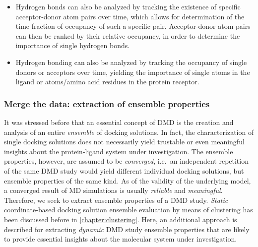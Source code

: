 \begin{itemize}
\begin{itemize}
\item Hydrogen bonds can also be analyzed by tracking the existence of specific
acceptor-donor atom pairs over time, which allows for determination of the time
fraction of occupancy of such a specific pair. Acceptor-donor atom pairs can
then be ranked by their relative occupancy, in order to determine the importance
of single hydrogen bonds.

\item Hydrogen bonding can also be analyzed by tracking the occupancy of single
donors or acceptors over time, yielding the importance of single atoms in the
ligand or atoms/amino acid residues in the protein receptor.
\end{itemize}

\end{itemize}


\subsubsection{Merge the data: extraction of ensemble properties}

It was stressed before that an essential concept of DMD is the creation and
analysis of an entire \textit{ensemble} of docking solutions. In fact, the
characterization of single docking solutions does not necessarily yield
trustable or even meaningful insights about the protein-ligand system under
investigation. The ensemble properties, however, are assumed to be
\textit{converged}, i.e.\ an independent repetition of the same DMD study would
yield different individual docking solutions, but ensemble properties of the
same kind. As of the validity of the underlying model, a converged result of MD
simulations is usually \textit{reliable} and \textit{meaningful}. Therefore, we
seek to extract ensemble properties of a DMD study. \textit{Static}
coordinate-based docking solution ensemble evaluation by means of clustering has
been discussed before in \cref{chapter:clustering}. Here, an additional approach
is described for extracting \textit{dynamic} DMD study ensemble properties that
are likely to provide essential insights about the molecular system under
investigation.

